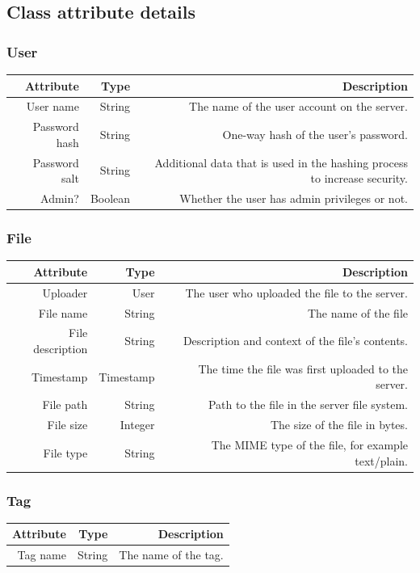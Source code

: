 \documentclass[10pt,a4paper]{article}
\begin{document}
\subsection{Class attribute details}
\subsubsection{User}
\begin{tabularx}{\textwidth}{|R|R|R|} \hline
\textbf{Attribute} & \textbf{Type} & \textbf{Description}\\ \hline
User name & String & The name of the user account on the server.\\ \hline
Password hash & String & One-way hash of the user's password.\\ \hline
Password salt & String & Additional data that is used in the hashing process to increase security.\\ \hline
Admin? & Boolean & Whether the user has admin privileges or not.\\ \hline
\end{tabularx}

\subsubsection{File}
\begin{tabularx}{\textwidth}{|R|R|R|} \hline
\textbf{Attribute} & \textbf{Type} & \textbf{Description}\\ \hline
Uploader & User & The user who uploaded the file to the server.\\ \hline
File name & String & The name of the file\\ \hline
File description & String & Description and context of the file's contents.\\ \hline
Timestamp & Timestamp & The time the file was first uploaded to the server.\\ \hline
File path & String & Path to the file in the server file system.\\ \hline
File size & Integer & The size of the file in bytes.\\ \hline
File type & String & The MIME type of the file, for example text/plain.\\ \hline
\end{tabularx}

\subsubsection{Tag}
\begin{tabularx}{\textwidth}{|R|R|R|} \hline
\textbf{Attribute} & \textbf{Type} & \textbf{Description}\\ \hline
Tag name & String & The name of the tag.\\ \hline
\end{tabularx}
\end{document}
